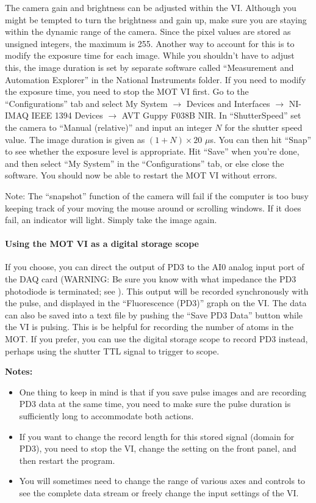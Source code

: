 \documentclass{../lab}
\begin{document}
The camera gain and brightness can be adjusted within the VI. Although you might be tempted to turn the brightness and gain up, make sure you are staying within the dynamic range of the camera. Since the pixel values are stored as unsigned integers, the maximum is 255. Another way to account for this is to modify the exposure time for each image. While you shouldn't have to adjust this, the image duration is set by separate software called ``Measurement and Automation Explorer'' in the National Instruments folder. If you need to modify the exposure time, you need to stop the MOT VI first. Go to the ``Configurations'' tab and select My System $\rightarrow$ Devices and Interfaces $\rightarrow$ NI-IMAQ IEEE 1394 Devices $\rightarrow$ AVT Guppy F038B NIR. In ``ShutterSpeed'' set the camera to ``Manual (relative)'' and input an integer $N$ for the shutter speed value. The image duration is given as $(1+N) \times 20$  $\mu$s. You can then hit ``Snap'' to see whether the exposure level is appropriate. Hit ``Save'' when you're done, and then select ``My System'' in the ``Configurations'' tab, or else close the software. You should now be able to restart the MOT VI without errors.

Note: The ``snapshot'' function of the camera will fail if the computer is too busy keeping track of your moving the mouse around or scrolling windows. If it does fail, an indicator will light. Simply take the image again.

\paragraph{Using the MOT VI as a digital storage scope}

If you choose, you can direct the output of PD3 to the AI0 analog input port of the DAQ card (WARNING: Be sure you know with what impedance the PD3 photodiode is terminated; see ). This output will be recorded synchronously with the pulse, and displayed in the ``Fluorescence (PD3)'' graph on the VI. The data can also be saved into a text file by pushing the ``Save PD3 Data'' button while the VI is pulsing. This is be helpful for recording the number of atoms in the MOT. If you prefer, you can use the digital storage scope to record PD3 instead, perhaps using the shutter TTL signal to trigger to scope.

\textbf{Notes:}

\begin{itemize}
    \item One thing to keep in mind is that if you save pulse images and are recording PD3 data at the same time, you need to make sure the pulse duration is sufficiently long to accommodate both actions.

    \item If you want to change the record length for this stored signal (domain for PD3), you need to stop the VI, change the setting on the front panel, and then restart the program.

    \item You will sometimes need to change the range of various axes and controls to see the complete data stream or freely change the input settings of the VI.
\end{itemize}
\end{document}
